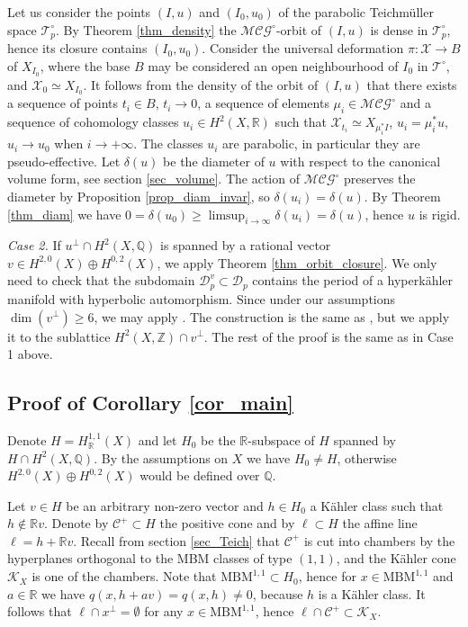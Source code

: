 \documentclass[11pt]{article}
\newcommand{\6}{\partial}
\newcommand{\bbZ}{\mathbb{Z}}
\newcommand{\bbQ}{\mathbb{Q}}
\newcommand{\bbR}{\mathbb{R}}
\newcommand{\CC}{\mathcal{C}}
\newcommand{\KK}{\mathcal{K}}
\newcommand{\XX}{\mathcal{X}}
\renewcommand{\ge}{\geqslant}
\newcommand{\Teich}{\mathcal{T}}
\newcommand{\TeichP}{\Teich_p}
\newcommand{\MC}{\mathcal{MCG}}
\newcommand{\Dom}{\mathcal{D}}
\newcommand{\DomP}{\Dom_p}
\newcommand{\MBM}{\mathrm{MBM}}
\begin{document}
Let us consider the points $(I,u)$ and $(I_0,u_0)$ of the parabolic Teichm\"uller space $\TeichP^\circ$.
By Theorem \ref{thm_density} the $\MC^\circ$-orbit of $(I,u)$ is dense in $\TeichP^\circ$,
hence its closure contains $(I_0,u_0)$. Consider the universal deformation $\pi\colon\XX\to B$ of $X_{I_0}$,
where the base $B$ may be considered an open neighbourhood of $I_0$ in $\Teich^\circ$,
and $\XX_0 \simeq X_{I_0}$.
It follows from the density of the orbit of $(I,u)$ that there exists a sequence of points
$t_i\in B$, $t_i\to 0$, a sequence of elements $\mu_i\in \MC^\circ$ and a sequence of cohomology
classes $u_i\in H^2(X,\bbR)$ such that $\XX_{t_i} \simeq X_{\mu_i^* I}$, $u_i =\mu_i^* u$,
$u_i \to u_0$ when $i\to +\infty$. The classes $u_i$ are parabolic, in particular they are pseudo-effective.
Let $\delta(u)$ be the diameter of $u$ with respect to the canonical volume form, see section \ref{sec_volume}.
The action of $\MC^\circ$ preserves the diameter by Proposition \ref{prop_diam_invar}, so $\delta(u_i) = \delta(u)$. By Theorem \ref{thm_diam} we have
$0 = \delta(u_0) \ge \limsup_{i\to\infty} \delta(u_i) = \delta(u)$, hence $u$ is rigid.

{\em Case 2.} If $u^\perp\cap H^2(X,\bbQ)$ is spanned by a rational vector $v\in H^{2,0}(X)\oplus H^{0,2}(X)$,
we apply Theorem \ref{thm_orbit_closure}. We only need to check that the subdomain $\DomP^v\subset \DomP$
contains the period of a hyperk\"ahler manifold with hyperbolic automorphism. Since under
our assumptions $\dim(v^\perp)\ge 6$, we may apply \cite[Theorem 3.4]{AV2}. The construction
is the same as \cite[Corollary 3.5]{AV2}, but we apply it to the sublattice $H^2(X,\bbZ)\cap v^\perp$.
The rest of the proof is the same as in Case 1 above.

\subsection{Proof of Corollary \ref{cor_main}}\label{sec_cor_proof}
Denote $H = H^{1,1}_\bbR(X)$ and let $H_0$ be the $\bbR$-subspace of $H$ spanned by $H\cap H^2(X,\bbQ)$.
By the assumptions on $X$ we have $H_0\neq H$, otherwise $H^{2,0}(X)\oplus H^{0,2}(X)$ would be defined over $\bbQ$.

Let $v\in H$ be an arbitrary non-zero vector and $h\in H_0$ a K\"ahler class such that $h\notin \bbR v$.
Denote by $\CC^+\subset H$ the positive cone and by $\ell \subset H$ the affine line $\ell = h +\bbR v$.
Recall from section \ref{sec_Teich} that $\CC^+$ is cut into chambers by the hyperplanes
orthogonal to the MBM classes of type $(1,1)$, and the K\"ahler cone $\KK_X$ is one of the
chambers. Note that $\MBM^{1,1}\subset H_0$, hence for $x\in\MBM^{1,1}$ and $a\in\bbR$ we have $q(x,h+av) = q(x,h)\neq 0$,
because $h$ is a K\"ahler class. It follows that $\ell\cap x^\perp = \emptyset$ for any $x\in \MBM^{1,1}$,
hence $\ell\cap\CC^+\subset \KK_X$.
\end{document}
